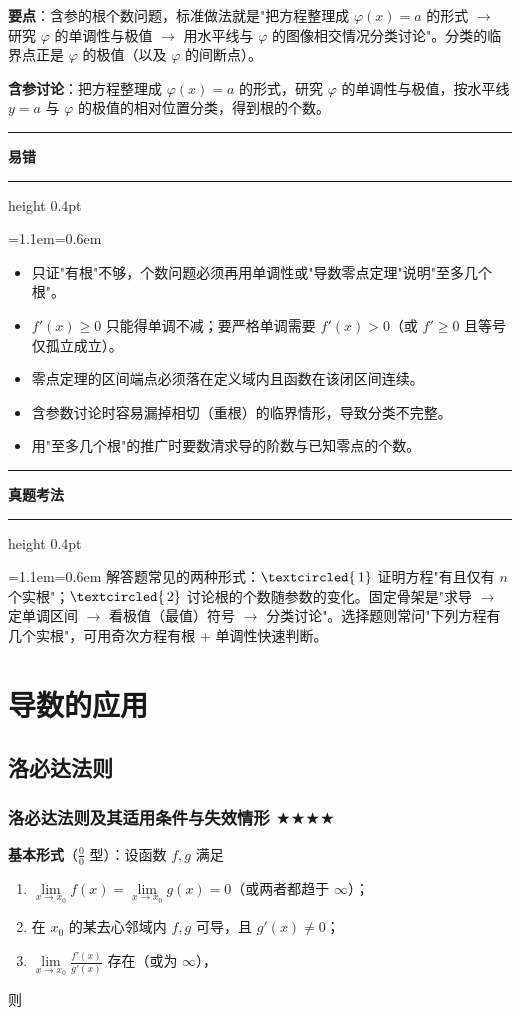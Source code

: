 \documentclass[11pt,openany,UTF8]{ctexbook}
\newcommand{\circled}[1]{\textcircled{\scriptsize\,#1}}
\newcommand{\callouthead}[2]{%
  \par\addvspace{7pt}\noindent
  {\color{#1}\rule[-0.15em]{3pt}{1.05em}}\hspace{0.5em}%
  {\bfseries\color{#1}#2}\par\nobreak\vspace{-0.35em}%
  {\color{rulesep}\hrule height 0.4pt}\nobreak\vspace{0.45em}%
  \begingroup\small\setlength{\parindent}{0pt}%
  \leftskip=1.1em\rightskip=0.6em\noindent\ignorespaces}
\newcommand{\calloutend}{\par\endgroup\addvspace{7pt}}
\newenvironment{callwarn}[1]{\callouthead{warnbar}{#1}}{\calloutend}
\newenvironment{callexam}[1]{\callouthead{exambar}{#1}}{\calloutend}
\begin{document}
\textbf{要点}：含参的根个数问题，标准做法就是"把方程整理成 $\varphi(x)=a$ 的形式 $\to$ 研究 $\varphi$ 的单调性与极值 $\to$ 用水平线与 $\varphi$ 的图像相交情况分类讨论"。分类的临界点正是 $\varphi$ 的极值（以及 $\varphi$ 的间断点）。

\textbf{含参讨论}：把方程整理成 $\varphi(x)=a$ 的形式，研究 $\varphi$ 的单调性与极值，按水平线 $y=a$ 与 $\varphi$ 的极值的相对位置分类，得到根的个数。

\begin{callwarn}{易错}
\begin{itemize}
\item 只证"有根"不够，个数问题必须再用单调性或"导数零点定理"说明"至多几个根"。
\item $f'(x)\ge0$ 只能得单调不减；要严格单调需要 $f'(x)>0$（或 $f'\ge0$ 且等号仅孤立成立）。
\item 零点定理的区间端点必须落在定义域内且函数在该闭区间连续。
\item 含参数讨论时容易漏掉相切（重根）的临界情形，导致分类不完整。
\item 用"至多几个根"的推广时要数清求导的阶数与已知零点的个数。
\end{itemize}
\end{callwarn}

\begin{callexam}{真题考法}
解答题常见的两种形式：$\circled{1}$ 证明方程"有且仅有 $n$ 个实根"；$\circled{2}$ 讨论根的个数随参数的变化。固定骨架是"求导 $\to$ 定单调区间 $\to$ 看极值（最值）符号 $\to$ 分类讨论"。选择题则常问"下列方程有几个实根"，可用奇次方程有根 + 单调性快速判断。

\end{callexam}

\section{导数的应用}

\subsection{洛必达法则}

\subsubsection{洛必达法则及其适用条件与失效情形 $\bigstar$$\bigstar$$\bigstar$$\bigstar$}

\textbf{基本形式}（$\frac00$ 型）：设函数 $f,g$ 满足

\begin{enumerate}
\item $\lim\limits_{x\to x_0}f(x)=\lim\limits_{x\to x_0}g(x)=0$（或两者都趋于 $\infty$）；
\item 在 $x_0$ 的某去心邻域内 $f,g$ 可导，且 $g'(x)\ne0$；
\item $\lim\limits_{x\to x_0}\frac{f'(x)}{g'(x)}$ 存在（或为 $\infty$），
\end{enumerate}
则
\end{document}
